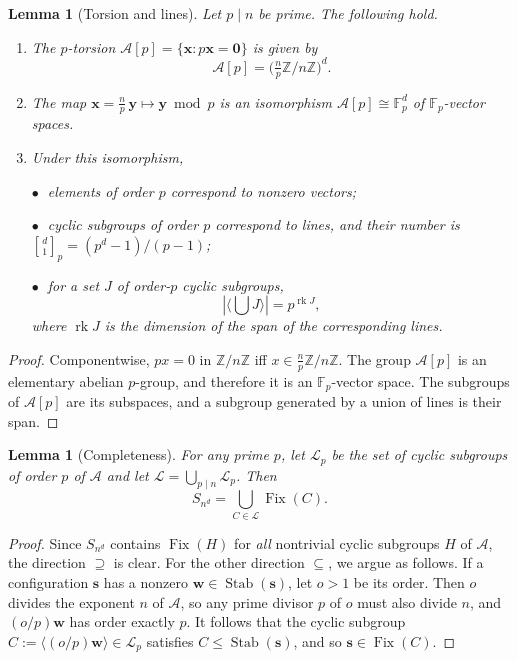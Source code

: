 \documentclass[11pt,a4paper]{article}
\newtheorem{lemma}[theorem]{Lemma}
\theoremstyle{remark}
\DeclareMathOperator{\Fix}{Fix}
\DeclareMathOperator{\Stab}{Stab}
\DeclareMathOperator{\rk}{rk}
\newcommand{\ZZ}{\mathbb{Z}}
\newcommand{\FF}{\mathbb{F}}
\newcommand{\A}{\mathcal{A}}
\newcommand{\ww}{\mathbf{w}}
\newcommand{\ssb}{\mathbf{s}}
\newcommand{\gaussbinom}[2]{\genfrac{[}{]}{0pt}{}{#1}{#2}}
\begin{document}
\begin{lemma}[Torsion and lines]\label{lem:torsion}
Let $p\mid n$ be prime. The following hold.

\begin{enumerate}[label=(\roman*)]
\item The $p$-torsion $\A[p]=\{\mathbf x:p\mathbf x=\mathbf 0\}$ is given by
\[\A[p]=\bigl(\tfrac np\ZZ/n\ZZ\bigr)^d.\]

\item The map $\mathbf x=\tfrac np\,\mathbf
y\mapsto\mathbf y\bmod p$ is an isomorphism $\A[p]\cong\FF_p^d$ of
$\FF_p$-vector spaces. 

\item Under this isomorphism, 

$\bullet \;$ elements of order $p$ correspond to
nonzero vectors; 

$\bullet \;$ cyclic subgroups of order $p$ correspond to lines, and
their number is $\gaussbinom d1_p=(p^d-1)/(p-1)$; 

$\bullet \;$ for a set $J$ of
order-$p$ cyclic subgroups, \[|\langle\bigcup J\rangle|=p^{\rk J},\] where
$\rk J$ is the dimension of the span of the corresponding lines.
\end{enumerate}
\end{lemma}

\begin{proof}
Componentwise, $px=0$ in $\ZZ/n\ZZ$ iff $x\in\tfrac np\ZZ/n\ZZ$. The group $\A[p]$
is an elementary abelian $p$-group, and therefore it is an $\FF_p$-vector space. The subgroups of 
$\A[p]$ are its subspaces, and a subgroup generated by a union of lines
is their span.
\end{proof}

\begin{lemma}[Completeness]\label{lem:completeness} For any prime $p$, let $\mathcal L_p$ be the set of cyclic subgroups of order $p$ of $\A$ and let
$\mathcal L=\bigcup_{p\mid n}\mathcal L_p$. Then
\[S_{n^d}=\bigcup_{C\in\mathcal L}\Fix(C).\]
\end{lemma}

\begin{proof}
Since $S_{n^d}$ contains $\Fix(H)$ for \emph{all} nontrivial cyclic subgroups $H$ of $\A$, the direction $\supseteq$ is clear. For the other direction $\subseteq$, we argue as follows. If a configuration $\ssb$ has a nonzero $\ww \in \Stab(\ssb)$, let $o>1$ be its order. Then $o$ divides the
exponent $n$ of $\A$, so any prime divisor $p$ of $o$ must also divide $n$, and
$(o/p)\ww$ has order exactly $p$. It follows that the cyclic subgroup
$C:=\langle(o/p)\ww\rangle\in\mathcal L_p$ satisfies $C\le\Stab(\ssb)$, and so $\ssb\in\Fix(C)$.
\end{proof}
\end{document}
